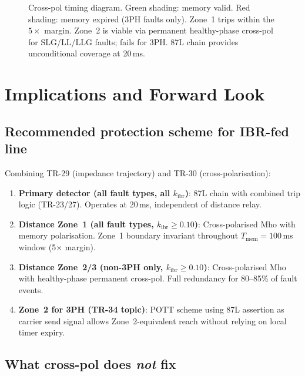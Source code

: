 \documentclass[11pt,a4paper]{article}
\begin{document}
\begin{figure}[h!]
\centering
\caption{%
  Cross-pol timing diagram.  Green shading: memory valid.  Red shading: memory
  expired (3PH faults only).  Zone~1 trips within the $5\times$ margin.
  Zone~2 is viable via permanent healthy-phase cross-pol for SLG/LL/LLG faults;
  fails for 3PH.  87L chain provides unconditional coverage at 20\,ms.}
\label{fig:timing}

\end{figure}

\section{Implications and Forward Look}
\label{sec:implications}

\subsection{Recommended protection scheme for IBR-fed line}

Combining TR-29 (impedance trajectory) and TR-30 (cross-polarisation):

\begin{enumerate}
  \item \textbf{Primary detector (all fault types, all $k_\mathrm{ibr}$)}: 87L chain
        with combined trip logic (TR-23/27).  Operates at 20\,ms, independent
        of distance relay.
  \item \textbf{Distance Zone~1 (all fault types, $k_\mathrm{ibr}\geq 0.10$)}:
        Cross-polarised Mho with memory polarisation.  Zone~1 boundary
        invariant throughout $T_\mathrm{mem}=100$\,ms window (5$\times$ margin).
  \item \textbf{Distance Zone~2/3 (non-3PH only, $k_\mathrm{ibr}\geq 0.10$)}:
        Cross-polarised Mho with healthy-phase permanent cross-pol.  Full
        redundancy for 80--85\% of fault events.
  \item \textbf{Zone~2 for 3PH (TR-34 topic)}: POTT scheme using 87L assertion as
        carrier send signal allows Zone~2-equivalent reach without relying on
        local timer expiry.
\end{enumerate}

\subsection{What cross-pol does \emph{not} fix}
\end{document}
